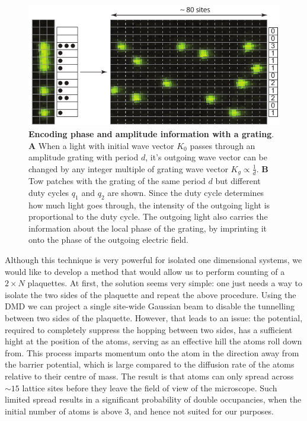 \begin{figure}[t]
	\centering
	\includegraphics[scale=1]{figures/CTE_fullcounting.pdf}
	\caption{{\bf Encoding phase and amplitude information with a grating}. {\bf A} When a light with initial wave vector $K_0$ passes through an amplitude grating with period $d$, it's outgoing wave vector can be changed by any integer multiple of grating wave vector $K_g\propto \frac{1}{d}$. {\bf B} Tow patches with the grating of the same period $d$ but different duty cycles $q_1$ and $q_2$ are shown. Since the duty cycle determines how much light goes through, the intensity of the outgoing light is proportional to the duty cycle. The outgoing light also carries the information about the local phase of the grating, by imprinting it onto the phase of the outgoing electric field.}
	\label{fig:CTE_fullcounting}
\end{figure}

Although this technique is very powerful for isolated one dimensional systems, we would like to develop a method that would allow us to perform counting of a $2\times N$ plaquettes. At first, the solution seems very simple: one just needs a way to isolate the two sides of the plaquette and repeat the above procedure. Using the DMD we can project a single site-wide Gaussian beam to disable the tunnelling between two sides of the plaquette. However, that leads to an issue: the potential, required to completely suppress the hopping between two sides, has a sufficient hight at the position of the atoms, serving as an effective hill the atoms roll down from. This process imparts momentum onto the atom in the direction away from the barrier potential, which is large compared to the diffusion rate of the atoms relative to their centre of mass. The result is that atoms can only spread across $\sim 15$ lattice sites before they leave the field of view of the microscope. Such limited spread results in a significant probability of double occupancies, when the initial number of atoms is above $3$, and hence not suited for our purposes.

